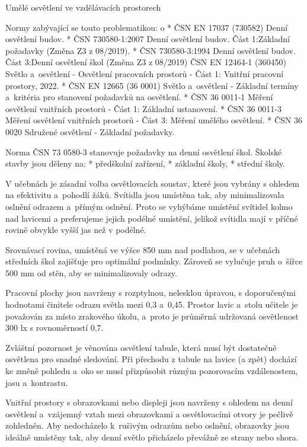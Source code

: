 \sec Umělé osvětlení ve vzdělávacích prostorech

Normy zabývající se touto problematikou:
\begitems \style o
* ČSN EN 17037 (730582) Denní osvětlení budov.
* ČSN 730580-1:2007 Denní osvětlení budov. Část 1:Základní požadavky (Změna Z3 z 08/2019).
* ČSN 730580-3:1994 Denní osvětlení budov. Část 3:Denní osvětlení škol (Změna Z3 z 08/2019)
ČSN EN 12464-1 (360450) Světlo a~osvětlení - Osvětlení pracovních prostorů - Část 1: Vnitřní pracovní prostory, 2022.
* ČSN EN 12665 (36 0001) Světlo a~osvětlení - Základní termíny a~kritéria pro stanovení požadavků na osvětlení.
* ČSN 36 0011-1 Měření osvětlení vnitřních prostorů - Část 1: Základní ustanovení.
* ČSN 36 0011-3 Měření osvětlení vnitřních prostorů - Část 3: Měření umělého osvětlení.
* ČSN 36 0020 Sdružené osvětlení - Základní požadavky.
\enditems

\noindent
Norma ČSN 73 0580-3 stanovuje požadavky na denní osvětlení škol. Školské stavby jsou děleny na:
\begitems
* předškolní zařízení,
* základní školy,
* střední školy.
\enditems

V učebnách je zásadní volba osvětlovacích soustav, které jsou vybrány s ohledem na efektivitu a~pohodlí žáků.
Svítidla jsou umístěna tak, aby minimalizovala oslnění odrazem a~přímým oslnění. Proto se vyhýbáme umístění svítidel kolmo nad lavicemi
a preferujeme jejich podélné umístění, jelikož svítidla mají v příčné rovině obvykle vyšší jas než v podélné.

Srovnávací rovina, umístěná ve výšce 850 mm nad podlahou,
se v učebnách středních škol zajišťuje pro optimální podmínky. 
Zároveň se vylučuje pruh o~šířce 500 mm od stěn, aby se minimalizovaly odrazy.

Pracovní plochy jsou navrženy s rozptylnou, nelesklou úpravou, s doporučenými hodnotami činitele odrazu světla mezi 0,3 a~0,45.
Prostor lavic a~stolu učitele je považován za místo zrakového úkolu,
a~proto je průměrná udržovaná osvětlenost 300 lx s rovnoměrností 0,7.

Zvláštní pozornost je věnována osvětlení tabule, která musí být dostatečně osvětlena pro snadné sledování.
Při přechodu z tabule na lavice (a zpět) dochází ke změně pohledu a~oko se musí přizpůsobit
různým pozorovacím vzdálenostem, jasu a~kontrastu.

Vnitřní prostory s obrazovkami nebo displeji jsou navrženy s ohledem na denní osvětlení a~vzájemný vztah mezi obrazovkami
a osvětlovacími otvory je pečlivě zohledněn. Aby nedocházelo k~rušivým odrazům nebo oslnění, obrazovky jsou ideálně umístěny tak,
aby denní světlo přicházelo převážně ze strany nebo shora.











